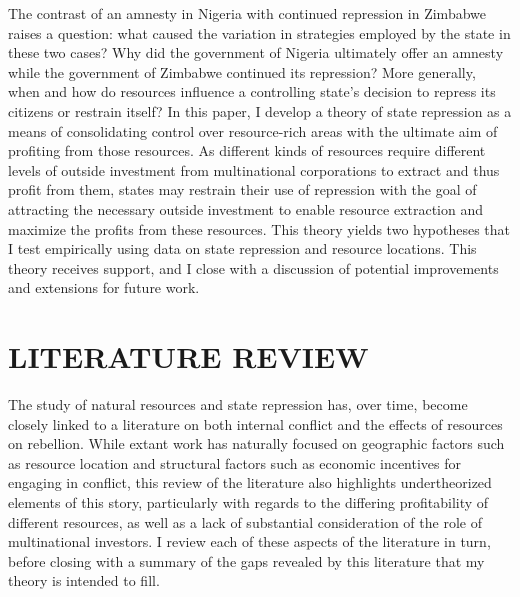 The contrast of an amnesty in Nigeria with continued repression in Zimbabwe raises a question: what caused the variation in strategies employed by the state in these two cases? Why did the government of Nigeria ultimately offer an amnesty while the government of Zimbabwe continued its repression? More generally, when and how do resources influence a controlling state’s decision to repress its citizens or restrain itself? In this paper, I develop a theory of state repression as a means of consolidating control over resource-rich areas with the ultimate aim of profiting from those resources. As different kinds of resources require different levels of outside investment from multinational corporations to extract and thus profit from them, states may restrain their use of repression with the goal of attracting the necessary outside investment to enable resource extraction and maximize the profits from these resources. This theory yields two hypotheses that I test empirically using data on state repression and resource locations. This theory receives support, and I close with a discussion of potential improvements and extensions for future work.

       
\newpage
\vspace*{25pt}
	\section*{\normalfont \hfill LITERATURE REVIEW \hfill}

The study of natural resources and state repression has, over time, become closely linked to a literature on both internal conflict and the effects of resources on rebellion. While extant work has naturally focused on geographic factors such as resource location and structural factors such as economic incentives for engaging in conflict, this review of the literature also highlights undertheorized elements of this story, particularly with regards to the differing profitability of different resources, as well as a lack of substantial consideration of the role of multinational investors. I review each of these aspects of the literature in turn, before closing with a summary of the gaps revealed by this literature that my theory is intended to fill.

